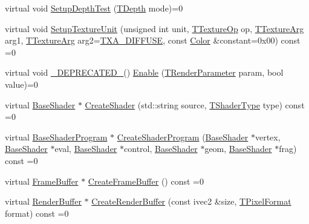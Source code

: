 \begin{DoxyCompactItemize}
\item 
virtual void \hyperlink{class_agmd_1_1_driver_a431a5401de0d77261b341de358faaf0c}{Setup\+Depth\+Test} (\hyperlink{namespace_agmd_a6bf1c529fabec2b3b33d9d94a032cc6a}{T\+Depth} mode)=0
\item 
virtual void \hyperlink{class_agmd_1_1_driver_a772215047c5605c5d1d321f3f5ddac7e}{Setup\+Texture\+Unit} (unsigned int unit, \hyperlink{namespace_agmd_aafbdbe5caf9cc8574624faa1943bf5ef}{T\+Texture\+Op} op, \hyperlink{namespace_agmd_ace3617cd312c454f60b4511e3e873db5}{T\+Texture\+Arg} arg1, \hyperlink{namespace_agmd_ace3617cd312c454f60b4511e3e873db5}{T\+Texture\+Arg} arg2=\hyperlink{namespace_agmd_ace3617cd312c454f60b4511e3e873db5a3b6eaeb8bc6375565b086e228263c2ee}{T\+X\+A\+\_\+\+D\+I\+F\+F\+U\+S\+E}, const \hyperlink{class_agmd_utilities_1_1_color}{Color} \&constant=0x00) const =0
\item 
virtual void \hyperlink{_common_defines_8h_a6602c025738b10d509fc133dabf88869}{\+\_\+\+D\+E\+P\+R\+E\+C\+A\+T\+E\+D\+\_\+}() \hyperlink{class_agmd_1_1_driver_aed5a533b299939f97e60de0897ca6cfb}{Enable} (\hyperlink{namespace_agmd_afc630cffacc9bfc42e46816feb4744ae}{T\+Render\+Parameter} param, bool value)=0
\item 
virtual \hyperlink{class_agmd_1_1_base_shader}{Base\+Shader} $\ast$ \hyperlink{class_agmd_1_1_driver_a8e8346a9341169d7486f8418a7671f67}{Create\+Shader} (std\+::string source, \hyperlink{namespace_agmd_a162a493eaff1589f07a505806e6724b4}{T\+Shader\+Type} type) const =0
\item 
virtual \hyperlink{class_agmd_1_1_base_shader_program}{Base\+Shader\+Program} $\ast$ \hyperlink{class_agmd_1_1_driver_afa92f4325c4af6876919627e76aa6e28}{Create\+Shader\+Program} (\hyperlink{class_agmd_1_1_base_shader}{Base\+Shader} $\ast$vertex, \hyperlink{class_agmd_1_1_base_shader}{Base\+Shader} $\ast$eval, \hyperlink{class_agmd_1_1_base_shader}{Base\+Shader} $\ast$control, \hyperlink{class_agmd_1_1_base_shader}{Base\+Shader} $\ast$geom, \hyperlink{class_agmd_1_1_base_shader}{Base\+Shader} $\ast$frag) const =0
\item 
virtual \hyperlink{class_agmd_1_1_frame_buffer}{Frame\+Buffer} $\ast$ \hyperlink{class_agmd_1_1_driver_a7c431ff6b04e96f258b987ae8d922a9c}{Create\+Frame\+Buffer} () const =0
\item 
virtual \hyperlink{class_agmd_1_1_render_buffer}{Render\+Buffer} $\ast$ \hyperlink{class_agmd_1_1_driver_a879e98a0d21b772b487b358dd912429b}{Create\+Render\+Buffer} (const ivec2 \&size, \hyperlink{namespace_agmd_afc48fd9fa5dccb4c5621c052bfd1a7ec}{T\+Pixel\+Format} format) const =0

\end{DoxyCompactItemize}
